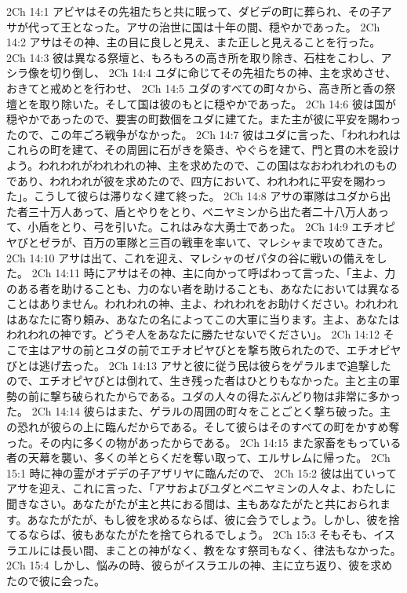 2Ch 14:1  アビヤはその先祖たちと共に眠って、ダビデの町に葬られ、その子アサが代って王となった。アサの治世に国は十年の間、穏やかであった。
2Ch 14:2  アサはその神、主の目に良しと見え、また正しと見えることを行った。
2Ch 14:3  彼は異なる祭壇と、もろもろの高き所を取り除き、石柱をこわし、アシラ像を切り倒し、
2Ch 14:4  ユダに命じてその先祖たちの神、主を求めさせ、おきてと戒めとを行わせ、
2Ch 14:5  ユダのすべての町々から、高き所と香の祭壇とを取り除いた。そして国は彼のもとに穏やかであった。
2Ch 14:6  彼は国が穏やかであったので、要害の町数個をユダに建てた。また主が彼に平安を賜わったので、この年ごろ戦争がなかった。
2Ch 14:7  彼はユダに言った、「われわれはこれらの町を建て、その周囲に石がきを築き、やぐらを建て、門と貫の木を設けよう。われわれがわれわれの神、主を求めたので、この国はなおわれわれのものであり、われわれが彼を求めたので、四方において、われわれに平安を賜わった」。こうして彼らは滞りなく建て終った。
2Ch 14:8  アサの軍隊はユダから出た者三十万人あって、盾とやりをとり、ベニヤミンから出た者二十八万人あって、小盾をとり、弓を引いた。これはみな大勇士であった。
2Ch 14:9  エチオピヤびとゼラが、百万の軍隊と三百の戦車を率いて、マレシャまで攻めてきた。
2Ch 14:10  アサは出て、これを迎え、マレシャのゼパタの谷に戦いの備えをした。
2Ch 14:11  時にアサはその神、主に向かって呼ばわって言った、「主よ、力のある者を助けることも、力のない者を助けることも、あなたにおいては異なることはありません。われわれの神、主よ、われわれをお助けください。われわれはあなたに寄り頼み、あなたの名によってこの大軍に当ります。主よ、あなたはわれわれの神です。どうぞ人をあなたに勝たせないでください」。
2Ch 14:12  そこで主はアサの前とユダの前でエチオピヤびとを撃ち敗られたので、エチオピヤびとは逃げ去った。
2Ch 14:13  アサと彼に従う民は彼らをゲラルまで追撃したので、エチオピヤびとは倒れて、生き残った者はひとりもなかった。主と主の軍勢の前に撃ち破られたからである。ユダの人々の得たぶんどり物は非常に多かった。
2Ch 14:14  彼らはまた、ゲラルの周囲の町々をことごとく撃ち破った。主の恐れが彼らの上に臨んだからである。そして彼らはそのすべての町をかすめ奪った。その内に多くの物があったからである。
2Ch 14:15  また家畜をもっている者の天幕を襲い、多くの羊とらくだを奪い取って、エルサレムに帰った。
2Ch 15:1  時に神の霊がオデデの子アザリヤに臨んだので、
2Ch 15:2  彼は出ていってアサを迎え、これに言った、「アサおよびユダとベニヤミンの人々よ、わたしに聞きなさい。あなたがたが主と共におる間は、主もあなたがたと共におられます。あなたがたが、もし彼を求めるならば、彼に会うでしょう。しかし、彼を捨てるならば、彼もあなたがたを捨てられるでしょう。
2Ch 15:3  そもそも、イスラエルには長い間、まことの神がなく、教をなす祭司もなく、律法もなかった。
2Ch 15:4  しかし、悩みの時、彼らがイスラエルの神、主に立ち返り、彼を求めたので彼に会った。
